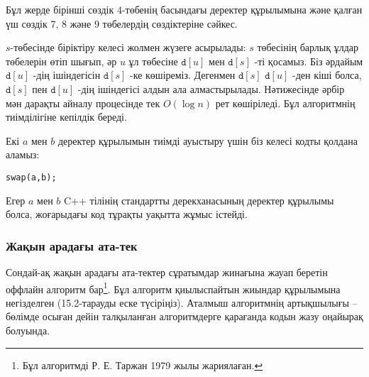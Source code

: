 Бұл жерде бірінші сөздік $4$-төбенің басындағы деректер
құрылымына және қалған үш сөздік 7, 8 және 9 төбелердің сөздіктеріне сәйкес.

$s$-төбесінде біріктіру келесі жолмен жүзеге асырылады: $s$ төбесінің барлық ұлдар төбелерін өтіп шығып,
әр $u$ ұл төбесіне $\texttt{d}[u]$ мен 
$\texttt{d}[s]$ -ті қосамыз.
Біз әрдайым $\texttt{d}[u]$ -дің ішіндегісін
$\texttt{d}[s]$ -ке көшіреміз.
Дегенмен $\texttt{d}[s]$
$\texttt{d}[u]$ -ден кіші болса, 
$\texttt{d}[s]$ пен $\texttt{d}[u]$ -дің ішіндегісі алдын ала алмастырылады. Нәтижесінде әрбір мән дарақты айналу процесінде тек $O(\log n)$ рет көшіріледі.
Бұл алгоритмнің тиімділігіне кепілдік береді.

Екі $a$ мен $b$ деректер құрылымын тиімді ауыстыру үшін
біз келесі кодты қолдана аламыз:
\begin{lstlisting}
swap(a,b);
\end{lstlisting}
Егер $a$ мен $b$ C++ тілінің стандартты дерекханасының 
деректер құрылымы болса, жоғарыдағы код тұрақты уақытта жұмыс
істейді.

\subsubsection{Жақын арадағы ата-тек}

Сондай-ақ жақын арадағы ата-тектер сұратымдар 
жинағына жауап беретін оффлайн алгоритм бар\footnote{Бұл
алгоритмді Р. Е. Таржан 1979 жылы жариялаған\cite{tar79}.}.
Бұл алгоритм қиылыспайтын жиындар құрылымына негізделген 
(15.2-тарауды еске түсіріңіз). Аталмыш алгоритмнің артықшылығы
-- бөлімде осыған дейін талқыланған алгоритмдерге қарағанда
кодын жазу оңайырақ болуында.


